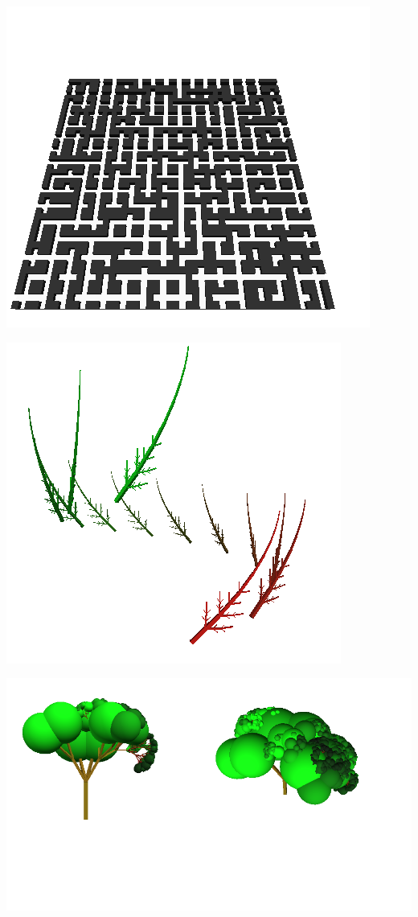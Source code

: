\centerline{\includegraphics[scale=0.40]{../imagenes/eg25.png}}




\centerline{\includegraphics[scale=0.40]{../imagenes/eg26.png}}




\centerline{\includegraphics[scale=0.40]{../imagenes/eg27.png}}


